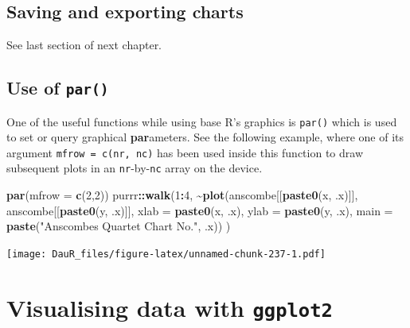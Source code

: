\documentclass[
]{book}
\newenvironment{Shaded}{\begin{snugshade}}{\end{snugshade}}
\newcommand{\AttributeTok}[1]{\textcolor[rgb]{0.13,0.29,0.53}{#1}}
\newcommand{\DecValTok}[1]{\textcolor[rgb]{0.00,0.00,0.81}{#1}}
\newcommand{\FunctionTok}[1]{\textcolor[rgb]{0.13,0.29,0.53}{\textbf{#1}}}
\newcommand{\NormalTok}[1]{#1}
\newcommand{\SpecialCharTok}[1]{\textcolor[rgb]{0.81,0.36,0.00}{\textbf{#1}}}
\newcommand{\StringTok}[1]{\textcolor[rgb]{0.31,0.60,0.02}{#1}}
\begin{document}
\hypertarget{saving-and-exporting-charts}{%
\section{Saving and exporting charts}\label{saving-and-exporting-charts}}

See last section of next chapter.

\hypertarget{use-of-par}{%
\section{\texorpdfstring{Use of \texttt{par()}}{Use of par()}}\label{use-of-par}}

One of the useful functions while using base R's graphics is \texttt{par()} which is used to set or query graphical \textbf{par}ameters. See the following example, where one of its argument \texttt{mfrow\ =\ c(nr,\ nc)} has been used inside this function to draw subsequent plots in an \texttt{nr}-by-\texttt{nc} array on the device.

\begin{Shaded}
\begin{Highlighting}[]
\FunctionTok{par}\NormalTok{(}\AttributeTok{mfrow =} \FunctionTok{c}\NormalTok{(}\DecValTok{2}\NormalTok{,}\DecValTok{2}\NormalTok{))}
\NormalTok{purrr}\SpecialCharTok{::}\FunctionTok{walk}\NormalTok{(}\DecValTok{1}\SpecialCharTok{:}\DecValTok{4}\NormalTok{, }
     \SpecialCharTok{\textasciitilde{}}\FunctionTok{plot}\NormalTok{(anscombe[[}\FunctionTok{paste0}\NormalTok{(}\StringTok{\textquotesingle{}x\textquotesingle{}}\NormalTok{, .x)]], }
\NormalTok{           anscombe[[}\FunctionTok{paste0}\NormalTok{(}\StringTok{\textquotesingle{}y\textquotesingle{}}\NormalTok{, .x)]], }
           \AttributeTok{xlab =} \FunctionTok{paste0}\NormalTok{(}\StringTok{\textquotesingle{}x\textquotesingle{}}\NormalTok{, .x),}
           \AttributeTok{ylab =} \FunctionTok{paste0}\NormalTok{(}\StringTok{\textquotesingle{}y\textquotesingle{}}\NormalTok{, .x),}
           \AttributeTok{main =} \FunctionTok{paste}\NormalTok{(}\StringTok{"Anscombe\textquotesingle{}s Quartet Chart No."}\NormalTok{, .x))}
\NormalTok{     )}
\end{Highlighting}
\end{Shaded}

\texttt{[image: DauR\_files/figure-latex/unnamed-chunk-237-1.pdf]}

\hypertarget{visualising-data-with-ggplot2}{%
\chapter{\texorpdfstring{Visualising data with \texttt{ggplot2}}{Visualising data with ggplot2}}\label{visualising-data-with-ggplot2}}
\end{document}
